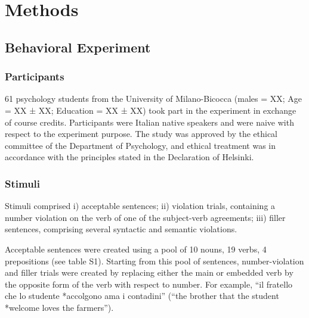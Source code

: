 \section{Methods}

\subsection{Behavioral Experiment}
\subsubsection{Participants}
61 psychology students from the University of Milano-Bicocca (males = XX; Age = XX ± XX; Education = XX ± XX) took part in the experiment in exchange of course credits. Participants were Italian native speakers and were naive with respect to the experiment purpose. The study was approved by the ethical committee of the Department of Psychology, and ethical treatment was in accordance with the principles stated in the Declaration of Helsinki.

\subsubsection{Stimuli}
Stimuli comprised i) acceptable sentences; ii) violation trials, containing a number violation on the verb of one of the subject-verb agreements; iii) filler sentences, comprising several syntactic and semantic violations. 

Acceptable sentences were created using a pool of 10 nouns, 19 verbs, 4 prepositions (see table S1).
Starting from this pool of sentences, number-violation and filler trials were created by replacing either the main or embedded verb by the opposite form of the verb with respect to number. For example, ``il fratello che lo studente *accolgono ama i contadini'' (``the brother that the student *welcome loves the farmers'').

